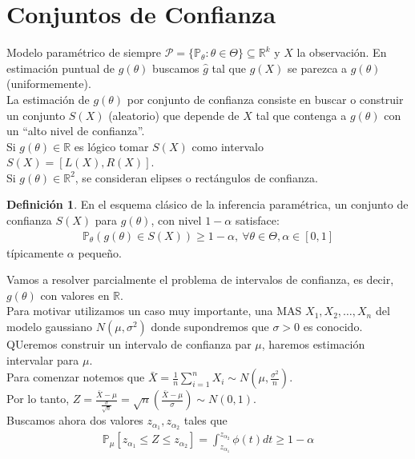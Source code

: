 \documentclass[10pt]{article}
\theoremstyle{plain}
\theoremstyle{definition}
\newtheorem{defi}{Definición}
\begin{document}
\section{Conjuntos de Confianza}
Modelo paramétrico de siempre $\mathcal{P}= \{\mathbb{P}_{\theta}\colon \theta \in \Theta\} \subseteq \mathbb{R}^k$ y $X$ la observación. En estimación puntual de $g(\theta)$ buscamos $\hat{g}$ tal que $\hat{g}(X)$ se parezca a $g(\theta)$ (uniformemente).\\
La estimación de $g(\theta)$ por conjunto de confianza consiste en buscar o construir un conjunto $S(X)$ (aleatorio) que depende de $X$ tal que contenga a $g(\theta)$ con un ``alto nivel de confianza''.\\
Si $g(\theta) \in \mathbb{R}$ es lógico tomar $S(X)$ como intervalo $S(X) = [L(X),R(X)]$.\\
Si $g(\theta) \in \mathbb{R}^2$, se consideran elipses o rectángulos de confianza.
\begin{defi}
En el esquema clásico de la inferencia paramétrica, un conjunto de confianza $S(X)$ para $g(\theta)$, con nivel $1-\alpha$ satisface:
\begin{align*}
\mathbb{P}_{\theta}(g(\theta) \in S(X)) \ge 1-\alpha,\ \forall \theta \in \Theta, \alpha \in [0,1]
\end{align*}
típicamente $\alpha$ pequeño.\\
\end{defi}
Vamos a resolver parcialmente el problema de intervalos de confianza, es decir, $g(\theta)$ con valores en $\mathbb{R}$.\\
Para motivar utilizamos un caso muy importante, una MAS $X_{1}, X_{2}, \ldots, X_{n}$ del modelo gaussiano $N(\mu, \sigma^2)$ donde supondremos que $\sigma>0$ es conocido. QUeremos construir un intervalo de confianza par $\mu$, haremos estimación intervalar para $\mu$.\\
Para comenzar notemos que $\bar{X} = \frac{1}{n}\sum_{i=1}^n X_{i} \sim N\left(\mu,\frac{\sigma^2}{n}\right)$.\\
Por lo tanto, $Z = \frac{\bar{X}-\mu}{\frac{\sigma}{\sqrt{n}}} = \sqrt{n}\left(\frac{\bar{X}-\mu}{\sigma}\right) \sim N(0,1)$.\\

Buscamos ahora dos valores $z_{\alpha_{1}}, z_{\alpha_{2}}$ tales que
\begin{align*}
\mathbb{P}_{\mu}[z_{\alpha_{1}}\le Z \le z_{\alpha_{2}}] = \int_{z_{\alpha_{1}}}^{z_{\alpha_{2}}}{\phi (t)dt} \ge 1-\alpha
\end{align*}
\end{document}
